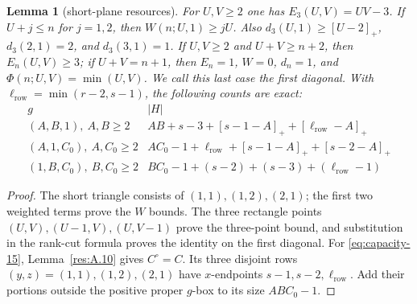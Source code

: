 \documentclass[11pt]{article}
\newtheorem{lemma}[theorem]{Lemma}
\theoremstyle{definition}
\theoremstyle{remark}
\theoremstyle{plain}
\begin{document}
\begin{lemma}[short-plane resources]\label{res:A3.1}
For $U,V\ge2$ one has $E_3(U,V)=UV-3$.
If $U+j\le n$ for $j=1,2$, then $W(n;U,1)\ge jU$.
Also $d_3(U,1)\ge[U-2]_+$, $d_3(2,1)=2$, and $d_3(3,1)=1$.
If $U,V\ge2$ and $U+V\ge n+2$, then $E_n(U,V)\ge3$;
if $U+V=n+1$, then $E_n=1$, $W=0$, $d_n=1$, and
$\Phi(n;U,V)=\min(U,V)$. We call this last case the first diagonal.
With $\ell_{\mathrm{row}}=\min(r-2,s-1)$, the following counts are exact:
\[
\begin{array}{c|l}
g&|H|\\\hline
(A,B,1),\ A,B\ge2&AB+s-3+[s-1-A]_++[\ell_{\mathrm{row}}-A]_+\\
(A,1,C_0),\ A,C_0\ge2&AC_0-1+\ell_{\mathrm{row}}+[s-1-A]_++[s-2-A]_+\\
(1,B,C_0),\ B,C_0\ge2&BC_0-1+(s-2)+(s-3)+(\ell_{\mathrm{row}}-1)
\end{array}\tag{3.15}\label{eq:capacity-15}
\]
\end{lemma}
\begin{proof}
The short triangle consists of $(1,1),(1,2),(2,1)$; the first two
weighted terms prove the $W$ bounds.  The three rectangle points
$(U,V),(U-1,V),(U,V-1)$ prove the three-point bound, and substitution
in the rank-cut formula proves the identity on the first diagonal.
For \eqref{eq:capacity-15}, Lemma~\ref{res:A.10} gives $C^\circ=C$.
Its three disjoint rows $(y,z)=(1,1),(1,2),(2,1)$ have
$x$-endpoints $s-1,s-2,\ell_{\mathrm{row}}$. Add their portions outside the
positive proper $g$-box to its size $ABC_0-1$. \end{proof}
\end{document}
